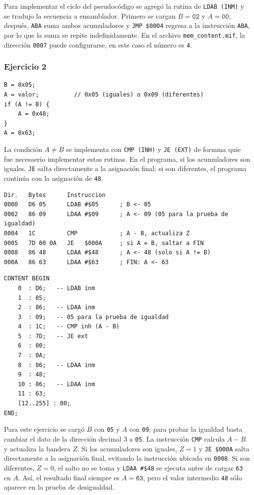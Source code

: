 \documentclass[letterpaper,12pt]{article}
\newcommand{\hx}[1]{\texttt{#1}}
\begin{document}
Para implementar el ciclo del pseudocódigo se agregó la rutina de \texttt{LDAB (INM)} y se tradujo la secuencia a ensamblador. Primero se cargan $B=\hx{02}$ y $A=\hx{00}$; después, \texttt{ABA} suma ambos acumuladores y \texttt{JMP \$0004} regresa a la instrucción \texttt{ABA}, por lo que la suma se repite indefinidamente. En el archivo \texttt{mem\_content.mif}, la dirección \hx{0007} puede configurarse, en este caso el número es \texttt{4}.


\subsubsection{Ejercicio 2}

\begin{lstlisting}[style=pseudo]
B = 0x05;
A = valor;          // 0x05 (iguales) o 0x09 (diferentes)
if (A != B) {
    A = 0x48;
}
A = 0x63;
\end{lstlisting}

La condición $A\neq B$ se implementa con \texttt{CMP (INH)} y \texttt{JE (EXT)} de formma quie fue necesaerio implementar estas rutinas. En el programa, si los acumuladores son iguales, \texttt{JE} salta directamente a la asignación final; si son diferentes, el programa continúa con la asignación de \hx{48}.

\begin{lstlisting}[style=asm,caption={Ejercicio 2 en ensamblador.},label={lst:asm2}]
Dir.   Bytes      Instruccion
0000   D6 05      LDAB #$05      ; B <- 05
0002   86 09      LDAA #$09      ; A <- 09 (05 para la prueba de igualdad)
0004   1C         CMP            ; A - B, actualiza Z
0005   7D 00 0A   JE   $000A     ; si A = B, saltar a FIN
0008   86 48      LDAA #$48      ; A <- 48 (solo si A != B)
000A   86 63      LDAA #$63      ; FIN: A <- 63
\end{lstlisting}

\begin{lstlisting}[style=mif,caption={Contenido de \texttt{mem\_content.mif} para el ejercicio 2.},label={lst:mif2}]
CONTENT BEGIN
    0  : D6;   -- LDAB inm
    1  : 05;
    2  : 86;   -- LDAA inm
    3  : 09;   -- 05 para la prueba de igualdad
    4  : 1C;   -- CMP inh (A - B)
    5  : 7D;   -- JE ext
    6  : 00;
    7  : 0A;
    8  : 86;   -- LDAA inm
    9  : 48;
    10 : 86;   -- LDAA inm
    11 : 63;
    [12..255] : 00;
END;
\end{lstlisting}

Para este ejercicio se cargó $B$ con \hx{05} y $A$ con \hx{09}; para probar la igualdad basta cambiar el dato de la dirección decimal 3 a \hx{05}. La instrucción \texttt{CMP} calcula $A-B$ y actualiza la bandera $Z$. Si los acumuladores son iguales, $Z=1$ y \texttt{JE \$000A} salta directamente a la asignación final, evitando la instrucción ubicada en \hx{0008}. Si son diferentes, $Z=0$, el salto no se toma y \texttt{LDAA \#\$48} se ejecuta antes de cargar \hx{63} en $A$. Así, el resultado final siempre es $A=\hx{63}$, pero el valor intermedio \hx{48} sólo aparece en la prueba de desigualdad. 
\end{document}
